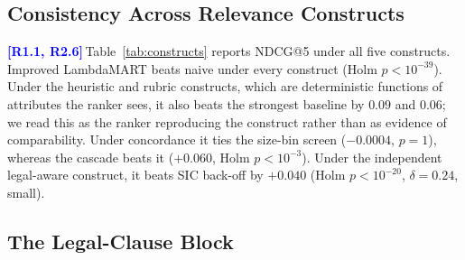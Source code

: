 \documentclass[conference]{IEEEtran}
\newcommand{\rc}[1]{\textcolor{blue}{\textbf{[#1]}}\,}
\newcommand{\rc}[1]{}
\begin{document}
\subsection{Consistency Across Relevance Constructs}

\rc{R1.1, R2.6}Table~\ref{tab:constructs} reports NDCG@5 under all five constructs. Improved LambdaMART beats naive under every construct (Holm $p<10^{-39}$). Under the heuristic and rubric constructs, which are deterministic functions of attributes the ranker sees, it also beats the strongest baseline by $0.09$ and $0.06$; we read this as the ranker reproducing the construct rather than as evidence of comparability. Under concordance it ties the size-bin screen ($-0.0004$, $p=1$), whereas the cascade beats it ($+0.060$, Holm $p<10^{-3}$). Under the independent legal-aware construct, it beats SIC back-off by $+0.040$ (Holm $p<10^{-20}$, $\delta=0.24$, small).

\begin{table}[t]
\centering
\caption{NDCG@5 under the five proxy constructs (GroupKFold by SIC). Strongest baseline: SIC back-off, except size bins under concordance.}
\label{tab:constructs}
\footnotesize
\setlength{\tabcolsep}{3pt}
\end{table}

\subsection{The Legal-Clause Block}
\end{document}
